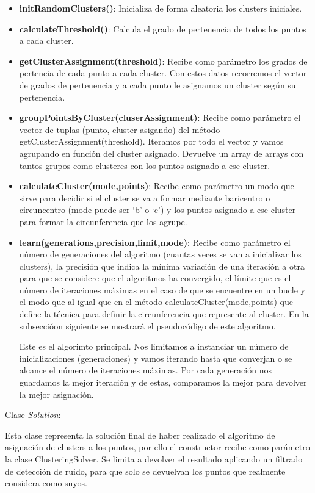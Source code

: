 \documentclass[conference,a4paper]{IEEEtran}
\begin{document}
\begin{itemize}

	\item{\textbf{initRandomClusters()}: Inicializa de forma aleatoria los clusters iniciales.}
	\item{\textbf{calculateThreshold()}: Calcula el grado de pertenencia de todos los puntos a cada cluster.}
	\item{\textbf{getClusterAssignment(threshold)}: Recibe como parámetro los grados de pertencia de cada punto a cada cluster. Con estos datos recorremos el vector de grados de pertenencia y a cada punto le asignamos un cluster según su pertenencia.}
	\item{\textbf{groupPointsByCluster(cluserAssignment)}: Recibe como parámetro el vector de tuplas (punto, cluster asigando) del método getClusterAssignment(threshold). Iteramos por todo el vector y vamos agrupando en función del cluster asignado. Devuelve un array de arrays con tantos grupos como clusteres con los puntos asignado a ese cluster.}
	\item{\textbf{calculateCluster(mode,points)}: Recibe como parámetro un modo que sirve para decidir si el cluster se va a formar mediante baricentro o circuncentro (mode puede ser ‘b’ o ‘c’) y los puntos asignado a ese cluster para formar la circunferencia que los agrupe.}
	\item{\textbf{learn(generations,precision,limit,mode)}: Recibe como parámetro el número de generaciones del algoritmo (cuantas veces se van a inicializar los clusters), la precisión que indica la mínima variación de una iteración a otra para que se considere que el algoritmos ha convergido, el límite que es el número de iteraciones máximas en el caso de que se encuentre en un bucle y el modo que al igual que en el método calculateCluster(mode,points) que define la técnica para definir la circunferencia que represente al cluster. En la subseccióon siguiente se mostrará el pseudocódigo de este algoritmo.

Este es el algorimto principal. Nos limitamos a instanciar un número de inicializaciones (generaciones) y vamos iterando hasta que converjan o se alcance el número de iteraciones máximas. Por cada generación nos guardamos la mejor iteración y de estas, comparamos la mejor para devolver la mejor asignación.}

\end{itemize}

\newpage
\underline{Clase \textit{Solution}}:

Esta clase representa la solución final de haber realizado el algoritmo de asignación de clusters a los puntos, por ello el constructor recibe como parámetro la clase ClusteringSolver. Se limita a devolver el resultado aplicando un filtrado de detección de ruido, para que solo se devuelvan los puntos que realmente considera como suyos.
\end{document}
